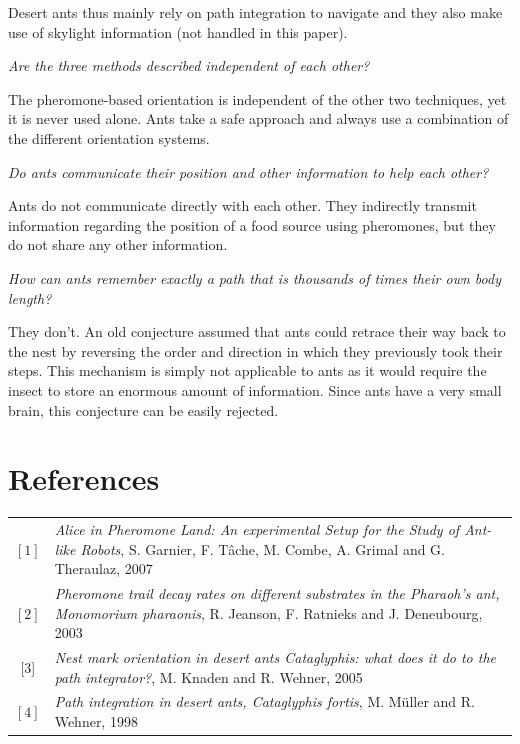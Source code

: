 \documentclass[11pt]{article}
\begin{document}
Desert ants thus mainly rely on path integration to navigate and they also make use of skylight information (not handled in this paper).

\begin{center}
	\emph{Are the three methods described independent of each other?}
\end{center}

The pheromone-based orientation is independent of the other two techniques, yet it is never used alone. Ants take a safe approach and always use a combination of the different orientation systems.

\begin{center}
	\emph{Do ants communicate their position and other information to help each other?}
\end{center}

Ants do not communicate directly with each other. They indirectly transmit information regarding the position of a food source using pheromones, but they do not share any other information.

\begin{center}
	\emph{How can ants remember exactly a path that is thousands of times their own body length?}
\end{center}

They don't. An old conjecture assumed that ants could retrace their way back to the nest by reversing the order and direction in which they previously took their steps. This mechanism is simply not applicable to ants as it would require the insect to store an enormous amount of information. Since ants have a very small brain, this conjecture can be easily rejected.

\section{References}

\begin{tabular}{ c p{14cm}}
  $[1]$ & \emph{Alice in Pheromone Land: An experimental Setup for the Study of Ant-like Robots}, S. Garnier, F. T\^{a}che, M. Combe, A. Grimal and G. Theraulaz, 2007 \\
  $[2]$& \emph{Pheromone trail decay rates on different substrates in the Pharaoh's ant, Monomorium pharaonis}, R. Jeanson, F. Ratnieks and J. Deneubourg, 2003  \\
  $[3$] & \emph{Nest mark orientation in desert ants Cataglyphis: what does it do to the path integrator?}, M. Knaden and R. Wehner, 2005  \\
  $[4]$ & \emph{Path integration in desert ants, Cataglyphis fortis}, M. M\"{u}ller and R. Wehner, 1998  \\
\end{tabular}
\end{document}
